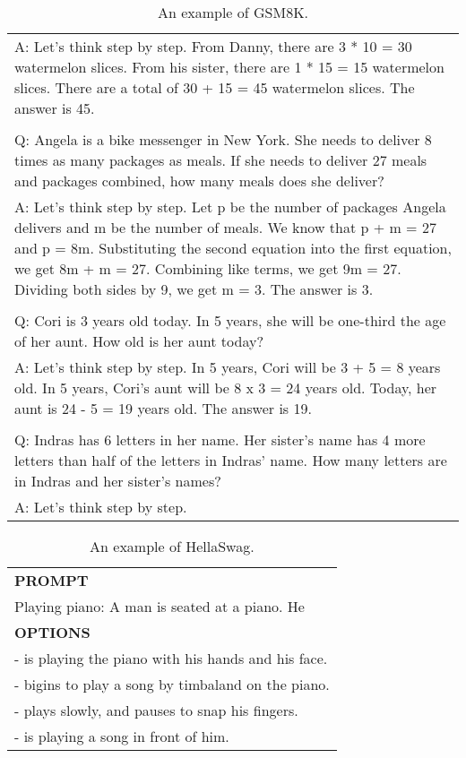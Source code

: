 \begin{table}[ht]
\begin{tabular}{p{12cm}}
\\A: Let's think step by step. From Danny, there are 3 * 10 = 30 watermelon slices. From his sister, there are 1 * 15 = 15 watermelon slices. There are a total of 30 + 15 = 45 watermelon slices. The answer is 45.
\\
\\Q: Angela is a bike messenger in New York. She needs to deliver 8 times as many packages as meals. If she needs to deliver 27 meals and packages combined, how many meals does she deliver?
\\A: Let's think step by step. Let p be the number of packages Angela delivers and m be the number of meals. We know that p + m = 27 and p = 8m. Substituting the second equation into the first equation, we get 8m + m = 27. Combining like terms, we get 9m = 27. Dividing both sides by 9, we get m = 3. The answer is 3.
\\
\\Q: Cori is 3 years old today. In 5 years, she will be one-third the age of her aunt. How old is her aunt today?
\\A: Let's think step by step. In 5 years, Cori will be 3 + 5 = 8 years old. In 5 years, Cori’s aunt will be 8 x 3 = 24 years old. Today, her aunt is 24 - 5 = 19 years old. The answer is 19.
\\
\\Q: Indras has 6 letters in her name. Her sister's name has 4 more letters than half of the letters in Indras' name. How many letters are in Indras and her sister's names?
\\A: Let's think step by step.\\
\bottomrule
\end{tabular}
    \caption{\centering An example of GSM8K.}
    \label{tab:gsm8k_eval_format_example}
\end{table}


\begin{table}[ht]
    \centering \small
\begin{tabular}{p{12cm}}
\toprule
\textbf{PROMPT}\\
Playing piano: A man is seated at a piano. He\\
\midrule
\textbf{OPTIONS}\\
- is playing the piano with his hands and his face.\\
- bigins to play a song by timbaland on the piano.\\
- plays slowly, and pauses to snap his fingers.\\
- is playing a song in front of him.\\
\bottomrule
\end{tabular}
    \caption{\centering An example of HellaSwag.}
    \label{tab:hellaswag_eval_format_example}
\end{table}

